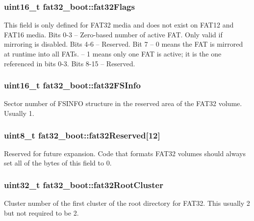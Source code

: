 \subsubsection[{\texorpdfstring{fat32\+Flags}{fat32Flags}}]{\setlength{\rightskip}{0pt plus 5cm}uint16\+\_\+t fat32\+\_\+boot\+::fat32\+Flags}\hypertarget{structfat32__boot_aaa31a140202021bf33aed72765531b3f}{}\label{structfat32__boot_aaa31a140202021bf33aed72765531b3f}
This field is only defined for F\+A\+T32 media and does not exist on F\+A\+T12 and F\+A\+T16 media. Bits 0-\/3 -- Zero-\/based number of active F\+AT. Only valid if mirroring is disabled. Bits 4-\/6 -- Reserved. Bit 7 -- 0 means the F\+AT is mirrored at runtime into all F\+A\+Ts. -- 1 means only one F\+AT is active; it is the one referenced in bits 0-\/3. Bits 8-\/15 -- Reserved. 
\subsubsection[{\texorpdfstring{fat32\+F\+S\+Info}{fat32FSInfo}}]{\setlength{\rightskip}{0pt plus 5cm}uint16\+\_\+t fat32\+\_\+boot\+::fat32\+F\+S\+Info}\hypertarget{structfat32__boot_a03ff6d1197c08688f20c7aad40206bc4}{}\label{structfat32__boot_a03ff6d1197c08688f20c7aad40206bc4}
Sector number of F\+S\+I\+N\+FO structure in the reserved area of the F\+A\+T32 volume. Usually 1. 
\subsubsection[{\texorpdfstring{fat32\+Reserved}{fat32Reserved}}]{\setlength{\rightskip}{0pt plus 5cm}uint8\+\_\+t fat32\+\_\+boot\+::fat32\+Reserved\mbox{[}12\mbox{]}}\hypertarget{structfat32__boot_a3343ad07c664fb7564d68c5194ea7da9}{}\label{structfat32__boot_a3343ad07c664fb7564d68c5194ea7da9}
Reserved for future expansion. Code that formats F\+A\+T32 volumes should always set all of the bytes of this field to 0. 
\subsubsection[{\texorpdfstring{fat32\+Root\+Cluster}{fat32RootCluster}}]{\setlength{\rightskip}{0pt plus 5cm}uint32\+\_\+t fat32\+\_\+boot\+::fat32\+Root\+Cluster}\hypertarget{structfat32__boot_aa216677f22a95dd86ed2e61604883a13}{}\label{structfat32__boot_aa216677f22a95dd86ed2e61604883a13}
Cluster number of the first cluster of the root directory for F\+A\+T32. This usually 2 but not required to be 2. 
